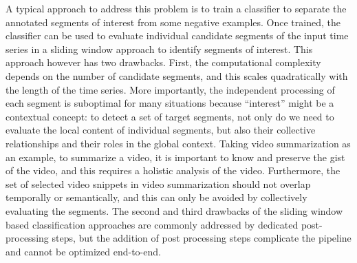\documentclass[10pt,journal,compsoc]{IEEEtran}
\begin{document}
A typical approach to address this problem is to train a classifier to separate the annotated segments of interest from some negative examples. Once trained, the classifier can be used to evaluate individual candidate segments of the input time series in a sliding window approach to identify segments of interest. This approach however has two drawbacks. First, the computational complexity depends on the number of candidate segments, and this scales quadratically with the length of the time series. More importantly, the independent processing of each segment is suboptimal for many situations because ``interest'' might be a contextual concept: to detect a set of target segments, not only do we need to evaluate the local content of individual segments, but also their collective relationships and their roles in the global context. Taking video summarization as an example, to summarize a video, it is important to know and preserve the gist of the video, and this requires a holistic analysis of the video. Furthermore, the set of selected video snippets in video summarization should not overlap temporally or semantically, and this can only be avoided by collectively evaluating the segments. The second and third drawbacks of the sliding window based classification approaches are commonly addressed by dedicated post-processing steps, but the addition of post processing steps complicate the pipeline and cannot be optimized end-to-end. 


%

%
%
\end{document}
